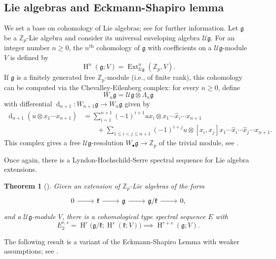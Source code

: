 \documentclass[11pt]{article}
\newcommand{\Zp}{\mathbb{Z}_p}
\newcommand{\g}{\mathfrak{g}}
\newcommand{\kk}{\mathfrak{k}}
\newcommand{\U}{\mathcal{U}}
\DeclareMathOperator{\dd}{d}
\DeclareMathOperator{\HH}{H}
\DeclareMathOperator{\Ext}{Ext}
\theoremstyle{plain}
\newtheorem{theorem}[lemma]{Theorem}
\theoremstyle{definition}
\begin{document}
\subsection{Lie algebras and Eckmann-Shapiro lemma} 


We set a base on cohomology of Lie algebras; see \cite[Chapter 7]{weibel94} for further information. Let $\g$ be a $\Zp$-Lie algebra and consider its universal enveloping algebra $\U\g$. For an integer number $n\geq 0$, the $n^{\text{th}}$ cohomology of $\g$ with coefficients on a $\U\g$-module $V$ is defined by
\begin{displaymath}
	\HH^n(\g;V)=\Ext_{\U\g}^n(\Zp,V).
\end{displaymath}
If $\g$ is a finitely generated free $\Zp$-module (i.e., of finite rank), this cohomology can be computed via the Chevalley-Eilenberg complex: for every $n\geq 0$, define 
\begin{displaymath}
	W_n\g=\U\g\otimes \Lambda_n\g
\end{displaymath}
with differential $\dd_{n+1}\colon W_{n+1}\g\longrightarrow W_{n}\g$ given by
\begin{align*}
	\dd_{n+1}(u\otimes x_1\dotsm x_{n+1})&=\sum_{i=1}^{n+1}(-1)^{i+1}ux_i\otimes x_1\dotsm\hat x_i\dotsm x_{n+1} \\
	& \qquad +
	\sum_{1\leq i<j\leq n+1}(-1)^{i+j} u\otimes [x_i,x_j]x_1\dotsm\hat x_i \dotsm\hat x_j\dotsm x_{n+1}.
\end{align*}
 This complex gives a free $\U\g$-resolution $W_{\bullet}\g\longrightarrow \Zp$ of the trivial module, see \cite[Section 7.7]{weibel94}.


Once again, there is a Lyndon-Hochschild-Serre spectral sequence for Lie algebra extensions.
\begin{theorem}[{\cite[Section 7.5]{weibel94}}]
	Given an extension of $\Zp$-Lie algebras of the form
	\[\begin{tikzcd}
		0 \rar & \kk \rar & \g \rar & \g/\kk \rar &  0,
	\end{tikzcd}\]
	and a $\U\g$-module $V$, there is a cohomological type spectral sequence $E$ with 
	\begin{displaymath}
		E_2^{r,s}=\HH^r\big(\g/\kk;\HH^s(\kk;V)\big) \implies \HH^{r+s}(\g;V).
	\end{displaymath}
\end{theorem}



The following result is a variant of the Eckmann-Shapiro Lemma with weaker assumptions; see \cite[page 118]{CE1956}.
\end{document}
